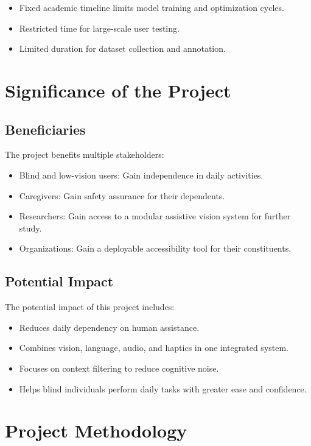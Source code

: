 \documentclass[12pt,a4paper]{report}
\begin{document}
\begin{itemize}
  \item Fixed academic timeline limits model training and optimization cycles.
  \item Restricted time for large-scale user testing.
  \item Limited duration for dataset collection and annotation.
\end{itemize}

\section{Significance of the Project}

\subsection{Beneficiaries}

The project benefits multiple stakeholders:

\begin{itemize}
  \item Blind and low-vision users: Gain independence in daily activities.
  \item Caregivers: Gain safety assurance for their dependents.
  \item Researchers: Gain access to a modular assistive vision system for further study.
  \item Organizations: Gain a deployable accessibility tool for their constituents.
\end{itemize}

\subsection{Potential Impact}

The potential impact of this project includes:

\begin{itemize}
  \item Reduces daily dependency on human assistance.
  \item Combines vision, language, audio, and haptics in one integrated system.
  \item Focuses on context filtering to reduce cognitive noise.
  \item Helps blind individuals perform daily tasks with greater ease and confidence.
\end{itemize}

\section{Project Methodology}
\end{document}
